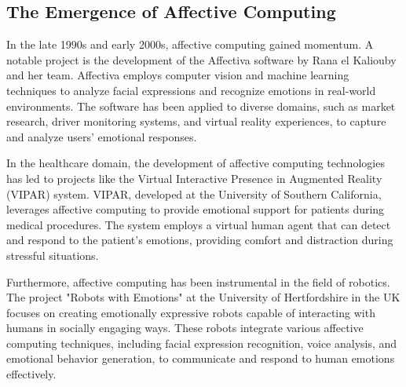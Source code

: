 \subsection{The Emergence of Affective Computing}
In the late 1990s and early 2000s, affective computing gained momentum. 
A notable project is the development of the Affectiva software by Rana el Kaliouby and her team. 
Affectiva employs computer vision and machine learning techniques to analyze facial expressions and recognize emotions in real-world environments.
The software has been applied to diverse domains, such as market research, driver monitoring systems, and virtual reality experiences, 
to capture and analyze users' emotional responses.

In the healthcare domain, the development of affective computing technologies has led to projects like the Virtual Interactive Presence in Augmented Reality (VIPAR) system. 
VIPAR, developed at the University of Southern California, leverages affective computing to provide emotional support for patients during medical procedures. 
The system employs a virtual human agent that can detect and respond to the patient's emotions, providing comfort and distraction during stressful situations.

Furthermore, affective computing has been instrumental in the field of robotics. 
The project "Robots with Emotions" at the University of Hertfordshire in the UK focuses 
on creating emotionally expressive robots capable of interacting with humans in socially engaging ways. 
These robots integrate various affective computing techniques, including facial expression recognition, voice analysis, and emotional behavior generation, 
to communicate and respond to human emotions effectively.